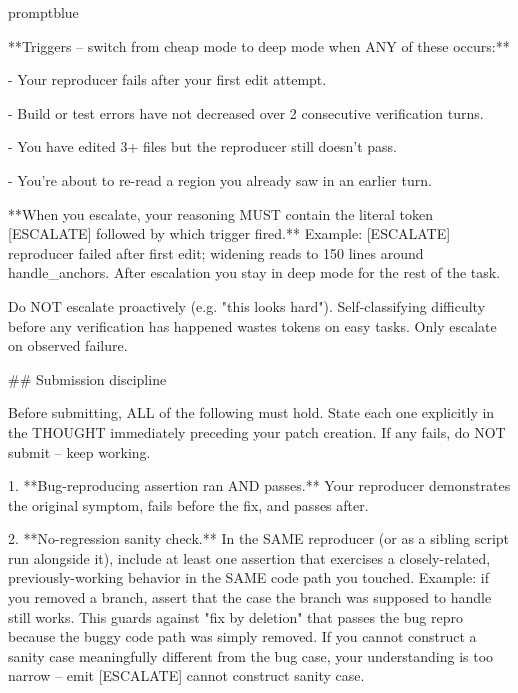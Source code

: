 \documentclass{llmxive}
\begin{document}
\begin{promptbox}{promptblue}
{**Triggers -- switch from cheap mode to deep mode when ANY of these occurs:**\par
- Your reproducer fails after your first edit attempt.\par
- Build or test errors have not decreased over 2 consecutive verification turns.\par
- You have edited 3+ files but the reproducer still doesn't pass.\par
- You're about to re-read a region you already saw in an earlier turn.\par
\vspace{0.35em}\par
**When you escalate, your reasoning MUST contain the literal token \textasciigrave{}[ESCALATE]\textasciigrave{} followed by which trigger fired.** Example: \textasciigrave{}[ESCALATE] reproducer failed after first edit; widening reads to 150 lines around handle\_anchors\textasciigrave{}. After escalation you stay in deep mode for the rest of the task.\par
\vspace{0.35em}\par
Do NOT escalate proactively (e.g. "this looks hard"). Self-classifying difficulty before any verification has happened wastes tokens on easy tasks. Only escalate on observed failure.\par
\vspace{0.35em}\par
\#\# Submission discipline\par
\vspace{0.35em}\par
Before submitting, ALL of the following must hold. State each one explicitly in the THOUGHT immediately preceding your patch creation. If any fails, do NOT submit -- keep working.\par
\vspace{0.35em}\par
1. **Bug-reproducing assertion ran AND passes.** Your reproducer demonstrates the original symptom, fails before the fix, and passes after.\par
2. **No-regression sanity check.** In the SAME reproducer (or as a sibling script run alongside it), include at least one assertion that exercises a closely-related, previously-working behavior in the SAME code path you touched. Example: if you removed a branch, assert that the case the branch was supposed to handle still works. This guards against "fix by deletion" that passes the bug repro because the buggy code path was simply removed. If you cannot construct a sanity case meaningfully different from the bug case, your understanding is too narrow -- emit \textasciigrave{}[ESCALATE] cannot construct sanity case\textasciigrave{}.\par
}
\end{promptbox}
\end{document}
